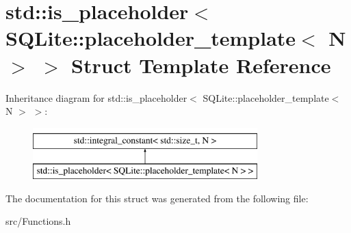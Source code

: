 \hypertarget{structstd_1_1is__placeholder_3_01_s_q_lite_1_1placeholder__template_3_01_n_01_4_01_4}{\section{std\-:\-:is\-\_\-placeholder$<$ S\-Q\-Lite\-:\-:placeholder\-\_\-template$<$ N $>$ $>$ Struct Template Reference}
\label{structstd_1_1is__placeholder_3_01_s_q_lite_1_1placeholder__template_3_01_n_01_4_01_4}
}
Inheritance diagram for std\-:\-:is\-\_\-placeholder$<$ S\-Q\-Lite\-:\-:placeholder\-\_\-template$<$ N $>$ $>$\-:\begin{figure}[H]
\begin{center}
\leavevmode
\includegraphics[height=2.000000cm]{structstd_1_1is__placeholder_3_01_s_q_lite_1_1placeholder__template_3_01_n_01_4_01_4}
\end{center}
\end{figure}


The documentation for this struct was generated from the following file\-:\begin{DoxyCompactItemize}
\item 
src/Functions.\-h\end{DoxyCompactItemize}

